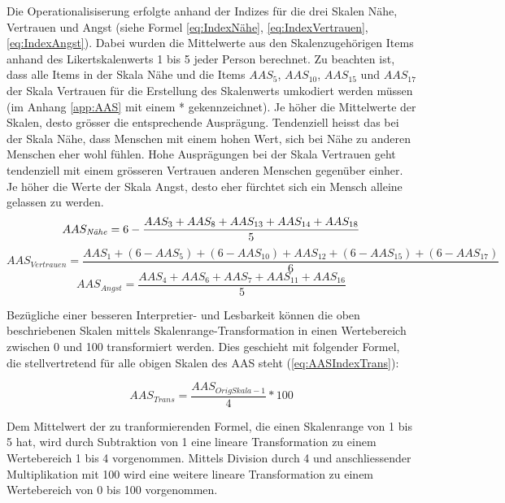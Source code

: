 Die Operationalisiserung erfolgte anhand der Indizes für die drei Skalen Nähe, Vertrauen und Angst (siehe Formel \ref{eq:IndexNähe}, \ref{eq:IndexVertrauen}, \ref{eq:IndexAngst}). Dabei wurden die Mittelwerte aus den Skalenzugehörigen Items anhand des Likertskalenwerts 1 bis 5 jeder Person berechnet. Zu beachten ist, dass alle Items in der Skala Nähe und die Items $AAS_{5}$, $AAS_{10}$, $AAS_{15}$ und $AAS_{17}$ der Skala Vertrauen für die Erstellung des Skalenwerts umkodiert werden müssen (im Anhang \ref{app:AAS} mit einem * gekennzeichnet). Je höher die Mittelwerte der Skalen, desto grösser die entsprechende Ausprägung. Tendenziell heisst das bei der Skala Nähe, dass Menschen mit einem hohen Wert, sich bei Nähe zu anderen Menschen eher wohl fühlen. Hohe Ausprägungen bei der Skala Vertrauen geht tendenziell mit einem grösseren Vertrauen anderen Menschen gegenüber einher. Je höher die Werte der Skala Angst, desto eher fürchtet sich ein Mensch alleine gelassen zu werden.
\begin{equation}\label{eq:IndexNähe}
    AAS_{\text{\textit{N{\"a}he}}}=6-\frac{AAS_{3}+AAS_{8}+AAS_{13}+AAS_{14}+AAS_{18}}{5}
\end{equation}
\begin{equation}\label{eq:IndexVertrauen}
    AAS_{Vertrauen}=\frac{AAS_{1}+(6-AAS_{5})+(6-AAS_{10})+AAS_{12}+(6-AAS_{15})+(6-AAS_{17})}{6}
\end{equation}
\begin{equation}\label{eq:IndexAngst}
    AAS_{Angst}=\frac{AAS_{4}+AAS_{6}+AAS_{7}+AAS_{11}+AAS_{16}}{5}
\end{equation}

Bezügliche einer besseren Interpretier- und Lesbarkeit können die oben beschriebenen Skalen mittels Skalenrange-Transformation in einen Wertebereich zwischen 0 und 100 transformiert werden. Dies geschieht mit folgender Formel, die stellvertretend für alle obigen Skalen des AAS steht (\ref{eq:AASIndexTrans}):

\begin{equation}\label{eq:AASIndexTrans}
    AAS_{Trans}=\frac{AAS_{OrigSkala - 1}}{4}*100
\end{equation}

Dem Mittelwert der zu tranformierenden Formel, die einen Skalenrange von 1 bis 5 hat, wird durch Subtraktion von 1 eine lineare Transformation zu einem Wertebereich 1 bis 4 vorgenommen. Mittels Division durch 4 und anschliessender Multiplikation mit 100 wird eine weitere lineare Transformation zu einem Wertebereich von 0 bis 100 vorgenommen.

